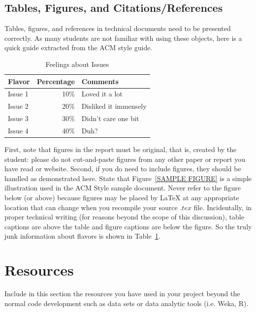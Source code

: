 \documentclass[12pt]{article}
\begin{document}
    \subsection{Tables, Figures, and Citations/References}

    Tables, figures, and references in technical
    documents need to be presented correctly. As many students
    are not familiar with using these objects, here is a quick
    guide extracted from the ACM style guide.

    \begin{table}
        \centering
        \caption{Feelings about Issues}
        \label{SAMPLE TABLE}
        \begin{tabular}{|l|r|l|}
            \hline
            Flavor  & Percentage & Comments              \\ \hline
            Issue 1 & 10\%       & Loved it a lot        \\ \hline
            Issue 2 & 20\%       & Disliked it immensely \\ \hline
            Issue 3 & 30\%       & Didn't care one bit   \\ \hline
            Issue 4 & 40\%       & Duh?                  \\ \hline
        \end{tabular}
    \end{table}


    First, note that figures in the report must be original, that is,
    created by the student: please do not cut-and-paste figures from any
    other paper or report you have read or website. Second, if you do need to include figures,
    they should be handled as demonstrated here. State that
    Figure~\ref{SAMPLE FIGURE} is a simple illustration used in the ACM
    Style sample document. Never refer to the figure below (or above)
    because figures may be placed by \LaTeX{} at any appropriate location
    that can change when you recompile your source $.tex$
    file. Incidentally, in proper technical writing (for reasons beyond
    the scope of this discussion), table captions are above the table and
    figure captions are below the figure. So the truly junk information
    about flavors is shown in Table~\ref{SAMPLE TABLE}.


    \section{Resources}
    Include in this section the resources you have used in your project beyond the normal code development such as data sets or data analytic tools (i.e. Weka, R).
\end{document}
